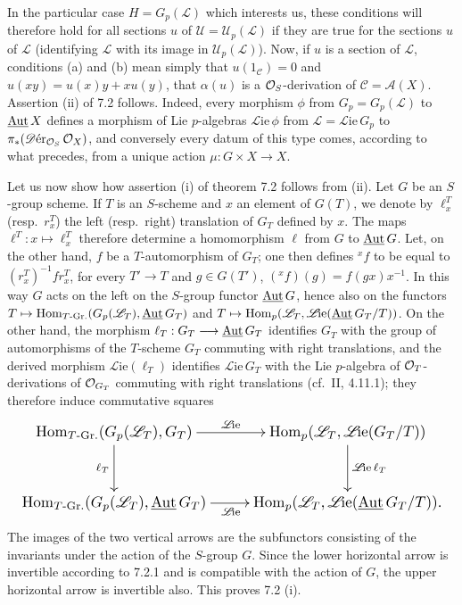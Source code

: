In the particular case $H=G_p(\mathscr L)$ which interests us, these conditions will therefore hold for all sections $u$ of $\mathscr U=\mathscr U_p(\mathscr L)$ if they are true for the sections $u$ of $\mathscr L$ (identifying $\mathscr L$ with its image in $\mathscr U_p(\mathscr L)$). Now, if $u$ is a section of $\mathscr L$, conditions (a) and (b) mean simply that $u(1_{\mathscr C})=0$ and $u(xy)=u(x)y+xu(y)$, \ie that $\alpha(u)$ is a $\mathcal{O}_S$-derivation of $\mathscr C=\mathscr A(X)$. Assertion (ii) of 7.2 follows. Indeed, every morphism $\phi$ from $G_p=G_p(\mathscr L)$ to $\underline{\operatorname{Aut}}\,X$ defines a morphism of Lie $p$-algebras $\mathscr L\!\mathrm{ie}\,\phi$ from $\mathscr L=\mathscr L\!\mathrm{ie}\,G_p$ to $\pi_*(\mathscr D\!\operatorname{\acute er}_{\mathcal{O}_S}\mathcal{O}_X)$, and conversely every datum of this type comes, according to what precedes, from a unique action $\mu:G\times X\to X$.

Let us now show how assertion (i) of theorem 7.2 follows from (ii). Let $G$ be an $S$-group scheme. If $T$ is an $S$-scheme and $x$ an element of $G(T)$, we denote by $\ell_x^T$ (resp.\ $r_x^T$) the left (resp.\ right) translation of $G_T$ defined by $x$. The maps $\ell^T:x\mapsto\ell_x^T$ therefore determine a homomorphism $\ell$ from $G$ to $\underline{\operatorname{Aut}}\,G$. Let, on the other hand, $f$ be a $T$-automorphism of $G_T$; one then defines ${}^xf$ to be equal to $(r_x^T)^{-1}fr_x^T$, \ie for every $T'\to T$ and $g\in G(T')$, $({}^xf)(g)=f(gx)x^{-1}$. In this way $G$ acts on the left on the $S$-group functor $\underline{\operatorname{Aut}}\,G$, hence also on the functors $T\mapsto\operatorname{Hom}_{T\text{-Gr.}}(G_p(\mathscr L_T),\underline{\operatorname{Aut}}\,G_T)$ and $T\mapsto\operatorname{Hom}_p(\mathscr L_T,\mathscr L\!\mathrm{ie}(\underline{\operatorname{Aut}}\,G_T/T))$. On the other hand, the morphism $\ell_T:G_T\longrightarrow\underline{\operatorname{Aut}}\,G_T$ identifies $G_T$ with the group of automorphisms of the $T$-scheme $G_T$ commuting with right translations, and the derived morphism $\mathscr L\!\mathrm{ie}(\ell_T)$ identifies $\mathscr L\!\mathrm{ie}\,G_T$ with the Lie $p$-algebra of $\mathcal{O}_T$-derivations of $\mathcal{O}_{G_T}$ commuting with right translations (cf.\ II, 4.11.1); they therefore induce commutative squares
\[
\resizebox{\linewidth}{!}{$\xymatrix@C=2.5em@R=3em{\Hom_{T\text{-Gr.}}(G_p(\mathscr L_T),G_T)\ar[r]^{\mathscr L\!\mathrm{ie}}\ar[d]_{\ell_T}&\Hom_p(\mathscr L_T,\mathscr L\!\mathrm{ie}(G_T/T))\ar[d]^{\mathscr L\!\mathrm{ie}\,\ell_T}\\
\Hom_{T\text{-Gr.}}(G_p(\mathscr L_T),\underline{\Aut}\,G_T)\ar[r]_{\mathscr L\!\mathrm{ie}}&\Hom_p(\mathscr L_T,\mathscr L\!\mathrm{ie}(\underline{\Aut}\,G_T/T)).}$}
\]
The images of the two vertical arrows are the subfunctors consisting of the invariants under the action of the $S$-group $G$. Since the lower horizontal arrow is invertible according to 7.2.1 and is compatible with the action of $G$, the upper horizontal arrow is invertible also. This proves 7.2 (i).

